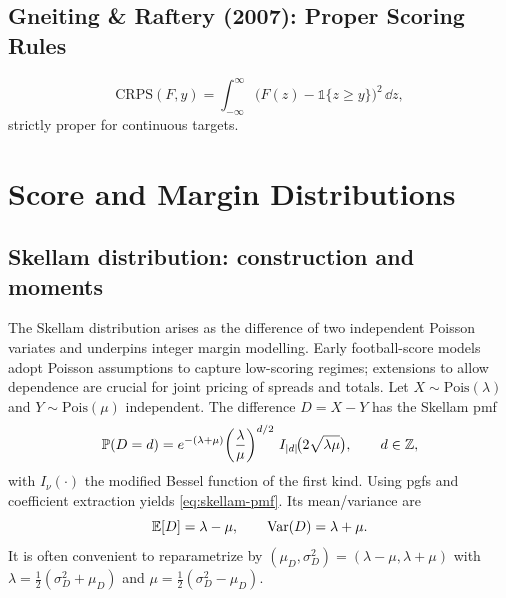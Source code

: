 \subsection{Gneiting \& Raftery (2007): Proper Scoring Rules} \label{subsec:gneiting2007}
\begin{equation}
\mathrm{CRPS}(F,y)=\int_{-\infty}^{\infty}\big(F(z)-\mathbb 1\{z\ge y\}\big)^2\,\dd z,
\end{equation}
strictly proper for continuous targets.  

\section{Score and Margin Distributions}
\subsection{Skellam distribution: construction and moments}\label{subsec:skellam-mom}
The Skellam distribution \citep{skellam1946} arises as the difference of two independent Poisson variates and underpins integer margin modelling. Early football-score models \citep{maher1982,dixon1997} adopt Poisson assumptions to capture low-scoring regimes; extensions to allow dependence \citep{karlis2003,koopman2015} are crucial for joint pricing of spreads and totals.
Let $X\sim\mathrm{Pois}(\lambda)$ and $Y\sim\mathrm{Pois}(\mu)$ independent. The difference
$D=X-Y$ has the Skellam pmf
\begin{equation}\label{eq:skellam-pmf}
\mathbb{P}(D=d)=e^{-(\lambda+\mu)}\!\left(\frac{\lambda}{\mu}\right)^{d/2}
\,I_{|d|}\!\big(2\sqrt{\lambda\mu}\big),\qquad d\in\mathbb{Z},
\end{equation}
with $I_\nu(\cdot)$ the modified Bessel function of the first kind. Using pgfs and coefficient
extraction yields \eqref{eq:skellam-pmf}. Its mean/variance are
\begin{equation}\label{eq:skellam-moments}
\mathbb{E}[D]=\lambda-\mu,\qquad \mathrm{Var}(D)=\lambda+\mu.
\end{equation}
It is often convenient to reparametrize by $(\mu_D,\sigma_D^2)=(\lambda-\mu,\lambda+\mu)$ with
$\lambda=\tfrac12(\sigma_D^2+\mu_D)$ and $\mu=\tfrac12(\sigma_D^2-\mu_D)$.

